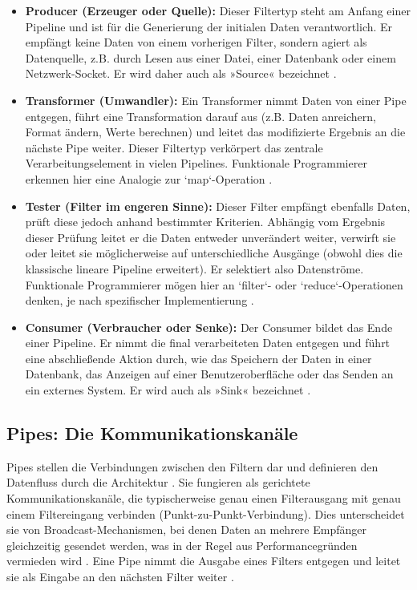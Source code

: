 \documentclass[11pt, a4paper]{article}
\begin{document}
\begin{itemize}
    \item \textbf{Producer (Erzeuger oder Quelle):} Dieser Filtertyp steht am Anfang einer Pipeline und ist für die Generierung der initialen Daten verantwortlich. Er empfängt keine Daten von einem vorherigen Filter, sondern agiert als Datenquelle, z.B. durch Lesen aus einer Datei, einer Datenbank oder einem Netzwerk-Socket. Er wird daher auch als »Source« bezeichnet \cite{RichardsFord2020}.
    \item \textbf{Transformer (Umwandler):} Ein Transformer nimmt Daten von einer Pipe entgegen, führt eine Transformation darauf aus (z.B. Daten anreichern, Format ändern, Werte berechnen) und leitet das modifizierte Ergebnis an die nächste Pipe weiter. Dieser Filtertyp verkörpert das zentrale Verarbeitungselement in vielen Pipelines. Funktionale Programmierer erkennen hier eine Analogie zur `map`-Operation \cite{RichardsFord2020}.
    \item \textbf{Tester (Filter im engeren Sinne):} Dieser Filter empfängt ebenfalls Daten, prüft diese jedoch anhand bestimmter Kriterien. Abhängig vom Ergebnis dieser Prüfung leitet er die Daten entweder unverändert weiter, verwirft sie oder leitet sie möglicherweise auf unterschiedliche Ausgänge (obwohl dies die klassische lineare Pipeline erweitert). Er selektiert also Datenströme. Funktionale Programmierer mögen hier an `filter`- oder `reduce`-Operationen denken, je nach spezifischer Implementierung \cite{RichardsFord2020}.
    \item \textbf{Consumer (Verbraucher oder Senke):} Der Consumer bildet das Ende einer Pipeline. Er nimmt die final verarbeiteten Daten entgegen und führt eine abschließende Aktion durch, wie das Speichern der Daten in einer Datenbank, das Anzeigen auf einer Benutzeroberfläche oder das Senden an ein externes System. Er wird auch als »Sink« bezeichnet \cite{RichardsFord2020}.
\end{itemize}

\subsection{Pipes: Die Kommunikationskanäle}

Pipes stellen die Verbindungen zwischen den Filtern dar und definieren den Datenfluss durch die Architektur \cite{RichardsFord2020}. Sie fungieren als gerichtete Kommunikationskanäle, die typischerweise genau einen Filterausgang mit genau einem Filtereingang verbinden (Punkt-zu-Punkt-Verbindung). Dies unterscheidet sie von Broadcast-Mechanismen, bei denen Daten an mehrere Empfänger gleichzeitig gesendet werden, was in der Regel aus Performancegründen vermieden wird \cite{RichardsFord2020}. Eine Pipe nimmt die Ausgabe eines Filters entgegen und leitet sie als Eingabe an den nächsten Filter weiter \cite{RichardsFord2020}.
\end{document}
